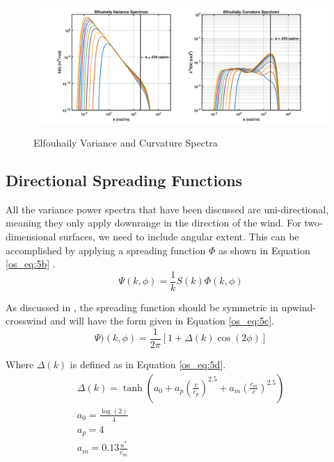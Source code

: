 \begin{figure}[H]
  \begin{center}
\includegraphics[width=6in]{../media/Ocean_Surface/elf_variance_curvature_spectrum.png}
  \end{center}
  \renewcommand{\baselinestretch}{1} \small\normalsize
  \begin{quote}
    \caption[Elfouhaily Variance and Curvature Spectra]{Elfouhaily Variance and Curvature Spectra\label{os_fig:3}}
  \end{quote}
\end{figure}
\renewcommand{\baselinestretch}{2} \small\normalsize

\subsection{Directional Spreading Functions}
All the variance power spectra that have been discussed are uni-directional, meaning they only apply downrange in the direction of the wind. For two-dimensional surfaces, we need to include angular extent. This can be accomplished by applying a spreading function $\Phi$ as shown in Equation \ref{os_eq:5b} \cite{elfouhaily}.
\begin{equation}
\label{os_eq:5b}
\Psi(k,\phi) = \frac{1}{k}S(k)\Phi(k,\phi)
\end{equation}
\renewcommand{\baselinestretch}{2} \small\normalsize

As discussed in \cite{elfouhaily}, the spreading function should be symmetric in upwind-crosswind and will have the form given in Equation \ref{os_eq:5c}.
\begin{equation}
\label{os_eq:5c}
\Psi)(k,\phi) = \frac{1}{2\pi}\left[1 + \Delta(k)\cos(2\phi) \right]
\end{equation}
\renewcommand{\baselinestretch}{2} \small\normalsize

Where $\Delta(k)$ is defined as in Equation \ref{os_eq:5d}.
\begin{equation}
\label{os_eq:5d}
\begin{gathered}
\Delta(k) = \tanh\left( a_0 + a_p\left(\frac{c}{c_p}\right)^{2.5}  + a_m\left(\frac{c_m}{c} \right)^{2.5}\right)\\
a_0 = \frac{\log(2)}{4} \\
a_p = 4\\
a_m = 0.13\frac{u^*}{c_m} \\
\end{gathered}
\end{equation}
\renewcommand{\baselinestretch}{2} \small\normalsize

